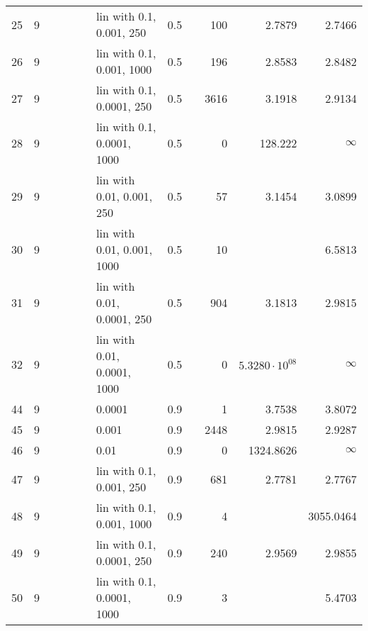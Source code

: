 \begin{longtable}{lrrrrrlrrrrr}
   25 &       9 &   &   &   &   &    lin with 0.1, 0.001, 250 &      0.5 &        &     100 &                 2.7879 &                 2.7466 \\
   26 &       9 &   &   &   &   &   lin with 0.1, 0.001, 1000 &      0.5 &        &     196 &                 2.8583 &                 2.8482 \\
   27 &       9 &   &   &   &   &   lin with 0.1, 0.0001, 250 &      0.5 &        &    3616 &                 3.1918 &                 2.9134 \\
   28 &       9 &   &   &   &   &  lin with 0.1, 0.0001, 1000 &      0.5 &        &       0 &                128.222 &               $\infty$ \\
   29 &       9 &   &   &   &   &   lin with 0.01, 0.001, 250 &      0.5 &        &      57 &                 3.1454 &                 3.0899 \\
   30 &       9 &   &   &   &   &  lin with 0.01, 0.001, 1000 &      0.5 &        &      10 &                        &                 6.5813 \\
   31 &       9 &   &   &   &   &  lin with 0.01, 0.0001, 250 &      0.5 &        &     904 &                 3.1813 &                 2.9815 \\
   32 &       9 &   &   &   &   & lin with 0.01, 0.0001, 1000 &      0.5 &        &       0 &  $5.3280\cdot 10^{08}$ &               $\infty$ \\
   44 &       9 &   &   &   &   &                      0.0001 &      0.9 &        &       1 &                 3.7538 &                 3.8072 \\
   45 &       9 &   &   &   &   &                       0.001 &      0.9 &        &    2448 &                 2.9815 &                 2.9287 \\
   46 &       9 &   &   &   &   &                        0.01 &      0.9 &        &       0 &              1324.8626 &               $\infty$ \\
   47 &       9 &   &   &   &   &    lin with 0.1, 0.001, 250 &      0.9 &        &     681 &                 2.7781 &                 2.7767 \\
   48 &       9 &   &   &   &   &   lin with 0.1, 0.001, 1000 &      0.9 &        &       4 &                        &              3055.0464 \\
   49 &       9 &   &   &   &   &   lin with 0.1, 0.0001, 250 &      0.9 &        &     240 &                 2.9569 &                 2.9855 \\
   50 &       9 &   &   &   &   &  lin with 0.1, 0.0001, 1000 &      0.9 &        &       3 &                        &                 5.4703 \\

\end{longtable}
